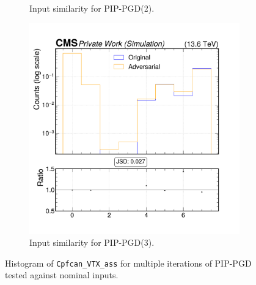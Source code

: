 \begin{figure}[h]
\begin{subfigure}[t]{0.32\textwidth}
    \caption*{Input similarity for PIP-PGD(2).}
  \end{subfigure}\hfill
  \begin{subfigure}[t]{0.32\textwidth}
    \includegraphics[width=\linewidth]{media/output/features/compare/combined_it_3/cmp_cpf_arr_Cpfcan_VTX_ass.pdf}
    \caption*{Input similarity for PIP-PGD(3).}
  \end{subfigure}

  \caption*{Histogram of \texttt{Cpfcan\_VTX\_ass} for multiple iterations of PIP-PGD tested against nominal inputs.}
  \label{fig:combined_input_Cpfcan_VTX_ass}
\end{figure}

